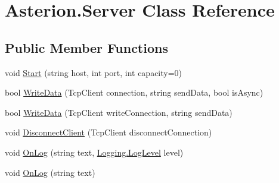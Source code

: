 \hypertarget{classAsterion_1_1Server}{\section{Asterion.\-Server Class Reference}
\label{classAsterion_1_1Server}
}
\subsection*{Public Member Functions}
\begin{DoxyCompactItemize}
\item 
void \hyperlink{classAsterion_1_1Server_a726376e4ce463d092a5d4abdd3a0c617}{Start} (string host, int port, int capacity=0)
\item 
bool \hyperlink{classAsterion_1_1Server_aa48dd9fb3a96b9ecc407bc435af6263e}{Write\-Data} (Tcp\-Client connection, string send\-Data, bool is\-Async)
\item 
bool \hyperlink{classAsterion_1_1Server_a99c1d00c261003225e3033eed7c95ab4}{Write\-Data} (Tcp\-Client write\-Connection, string send\-Data)
\item 
void \hyperlink{classAsterion_1_1Server_a8f6acbef91dc68fa441b0f8746f8acd4}{Disconnect\-Client} (Tcp\-Client disconnect\-Connection)
\item 
void \hyperlink{classAsterion_1_1Server_a8d2ad7f8335488263e986db82c64e3eb}{On\-Log} (string text, \hyperlink{namespaceAsterion_1_1Logging_afaaa8cc38da45118ed4f5c2064c2a28c}{Logging.\-Log\-Level} level)
\item 
void \hyperlink{classAsterion_1_1Server_a0e4c8d85fb7a4641250516fee636dfee}{On\-Log} (string text)
\end{DoxyCompactItemize}

